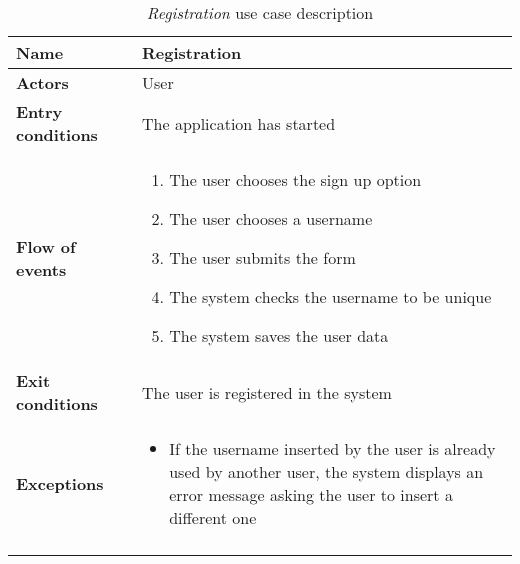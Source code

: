 		\begin{longtable}{p{0.25\linewidth}p{0.75\linewidth}}
			\toprule
			\textbf{Name} & \textbf{Registration} \\
			\midrule
			\textbf{Actors} & User \\
			\midrule
			\textbf{Entry conditions} & The application has started \\
			\midrule
			\textbf{Flow of events} & 
			\begin{enumerate}
				\item The user chooses the sign up option
				\item The user chooses a username
				\item The user submits the form
				\item The system checks the username to be unique
				\item The system saves the user data
			\end{enumerate} \\
			\midrule
			\textbf{Exit conditions} & The user is registered in the system\\
			\midrule
			\textbf{Exceptions} & 
			\begin{itemize}
				\item If the username inserted by the user is already used by another user, the system displays an error message asking the user to insert a different one
			\end{itemize} \\
			\bottomrule
			\caption{\emph{Registration} use case description}
		\end{longtable}
	
